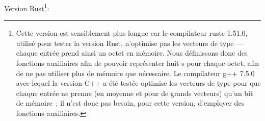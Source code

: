     
    \bigskip
    
    \noindent Version Rust\footnote{
        Cette version est sensiblement plus longue car le compilateur rustc 1.51.0, utilisé pour tester la version Rust, n'optimise pas les vecteurs de type —chaque entrée prend ainsi un octet en mémoire. 
        Nous définissons donc des fonctions auxiliaires afin de pouvoir représenter huit s pour chaque octet, afin de ne pas utiliser plus de mémoire que nécessaire.
        Le compilateur g++ 7.5.0 avec lequel la version C++ a été testée optimise les vecteurs de type  pour que chaque entrée ne prenne (en moyenne et pour de grands vecteurs) qu'un bit de mémoire ; il n'est donc pas besoin, pour cette version, d'employer des fonctions auxiliaires. 
    }: 
    
    \blank[samepage]

    
  \stopsection
  
\stopchapter
